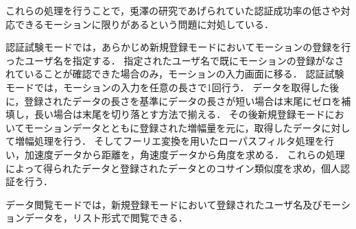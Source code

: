 これらの処理を行うことで，兎澤の研究であげられていた認証成功率の低さや対応できるモーションに限りがあるという問題に対処している．

認証試験モードでは，あらかじめ新規登録モードにおいてモーションの登録を行ったユーザ名を指定する．
指定されたユーザ名で既にモーションの登録がなされていることが確認できた場合のみ，モーションの入力画面に移る．
認証試験モードでは，モーションの入力を任意の長さで1回行う．
データを取得した後に，登録されたデータの長さを基準にデータの長さが短い場合は末尾にゼロを補填し，長い場合は末尾を切り落とす方法で揃える．
その後新規登録モードにおいてモーションデータとともに登録された増幅量を元に，取得したデータに対して増幅処理を行う．
そしてフーリエ変換を用いたローパスフィルタ処理を行い，加速度データから距離を，角速度データから角度を求める．
これらの処理によって得られたデータと登録されたデータとのコサイン類似度を求め，個人認証を行う．

データ閲覧モードでは，新規登録モードにおいて登録されたユーザ名及びモーションデータを，リスト形式で閲覧できる．

